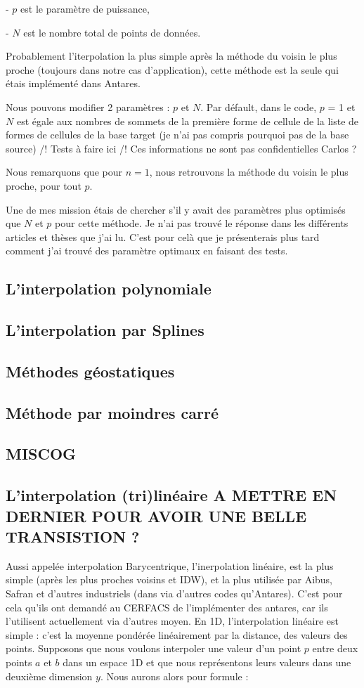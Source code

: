 - \(p\) est le paramètre de puissance,

- \(N\) est le nombre total de points de données.



Probablement l'iterpolation la plus simple après la méthode du voisin le plus proche (toujours dans notre cas d'application), cette méthode est la seule qui étais implémenté dans Antares.

Nous pouvons modifier 2 paramètres : \(p\) et \(N\).
Par défault, dans le code, \(p\) = 1 et \(N\) est égale aux nombres de sommets de la première forme de cellule de la liste de formes de cellules de la base target (je n'ai pas compris pourquoi pas de la base source) /! Tests à faire ici /!
Ces informations ne sont pas confidentielles Carlos ?

Nous remarquons que pour \( n = 1 \), nous retrouvons la méthode du voisin le plus proche, pour tout \( p \).

Une de mes mission étais de chercher s'il y avait des paramètres plus optimisés que \(N\) et \(p\) pour cette méthode. Je n'ai pas trouvé le réponse dans les différents articles et thèses que j'ai lu. C'est pour celà que je présenterais plus tard comment j'ai trouvé des paramètre optimaux en faisant des tests.


\subsection{L'interpolation polynomiale}
\subsection{L'interpolation par Splines}
\subsection{Méthodes géostatiques}
\subsection{Méthode par moindres carré}
\subsection{MISCOG}

\subsection{L'interpolation (tri)linéaire   A METTRE EN DERNIER POUR AVOIR UNE BELLE TRANSISTION ?}
Aussi appelée interpolation Barycentrique, l'inerpolation linéaire, est la plus simple (après les plus proches voisins et IDW), et la plus utilisée par Aibus, Safran et d'autres industriels (dans via d'autres codes qu'Antares).
C'est pour cela qu'ils ont demandé au CERFACS de l'implémenter des antares, car ils l'utilisent actuellement via d'autres moyen.
En 1D, l'interpolation linéaire est simple : c'est la moyenne pondérée linéairement par la distance, des valeurs des points.
Supposons que nous voulons interpoler une valeur d'un point \( p \) entre deux points \( a \) et \( b \) dans un espace 1D
et que nous représentons leurs valeurs dans une deuxième dimension \( y \).
Nous aurons alors pour formule :

